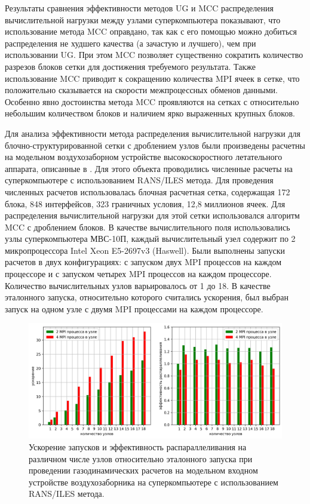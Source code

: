 Результаты сравнения эффективности методов UG и MCC распределения вычислительной нагрузки между узлами суперкомпьютера показывают, что использование метода MCC оправдано, так как с его помощью можно добиться распределения не худшего качества (а зачастую и лучшего), чем при использовании UG.
При этом MCC позволяет существенно сократить количество разрезов блоков сетки для достижения требуемого результата.
Также использование MCC приводит к сокращению количества MPI ячеек в сетке, что положительно сказывается на скорости межпроцессных обменов данными.
Особенно явно достоинства метода MCC проявляются на сетках с относительно небольшим количеством блоков и наличием ярко выраженных крупных блоков.

Для анализа эффективности метода распределения вычислительной нагрузки для блочно-структурированной сетки с дроблением узлов были произведены расчетны на модельном воздухозаборном устройстве высокоскоростного летательного аппарата, описанные в \cite{Bendersky2017Eff}.
Для этого объекта проводились численные расчеты на суперкомпьютере с использованием RANS/ILES метода.
Для проведения численных расчетов использовалась блочная расчетная сетка, содержащая 172 блока, 848 интерфейсов, 323 граничных условия, 12,8 миллионов ячеек.
Для распределения вычислительной нагрузки для этой сетки использовался алгоритм MCC с дроблением блоков.
В качестве вычислительного поля использовались узлы суперкомпьютера МВС-10П, каждый вычислительный узел содержит по 2 микропроцессора Intel Xeon E5-2697v3 (Haswell).
Были выполнены запуски расчетов в двух конфигурациях: с запуском двух MPI процессов на каждом процессоре и с запуском четырех MPI процессов на каждом процессоре.
Количество вычислительных узлов варьировалось от 1 до 18.
В качестве эталонного запуска, относительно которого считались ускорения, был выбран запуск на одном узле с двумя MPI процессами на каждом процессоре. 

\begin{figure}[ht]
\centering
\includegraphics[width=1.0\textwidth]{./pics/text_2_withcut/scaling2.png}
\singlespacing
{}\caption{Ускорение запусков и эффективность распараллеливания на различном числе узлов относительно эталонного запуска при проведении газодинамических расчетов на модельном входном устройстве воздухозаборника на суперкомпьютере с использованием RANS/ILES метода.}
\label{fig:text_2_withcut_scaling2}
\end{figure}

